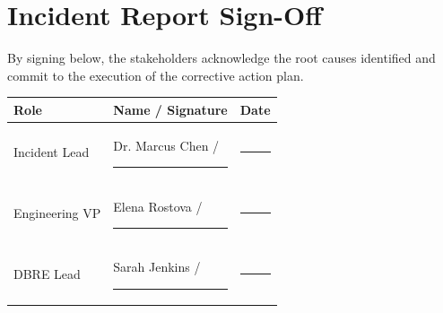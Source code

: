 \section{Incident Report Sign-Off}
By signing below, the stakeholders acknowledge the root causes identified and commit to the execution of the corrective action plan.

\vspace{0.2cm}
\begin{center}
\begin{tabularx}{\textwidth}{>{\raggedright\arraybackslash}X >{\raggedright\arraybackslash}X >{\raggedright\arraybackslash}X}
  \toprule
  \textbf{Role} & \textbf{Name / Signature} & \textbf{Date} \\
  \midrule
  Incident Lead & Dr. Marcus Chen / \rule{3.2cm}{0.5pt} & \rule{3.2cm}{0.5pt} \\
  \rowcolor{LightNeutral}
  Engineering VP & Elena Rostova / \rule{3.2cm}{0.5pt} & \rule{3.2cm}{0.5pt} \\
  DBRE Lead & Sarah Jenkins / \rule{3.2cm}{0.5pt} & \rule{3.2cm}{0.5pt} \\
  \bottomrule
\end{tabularx}
\end{center}
